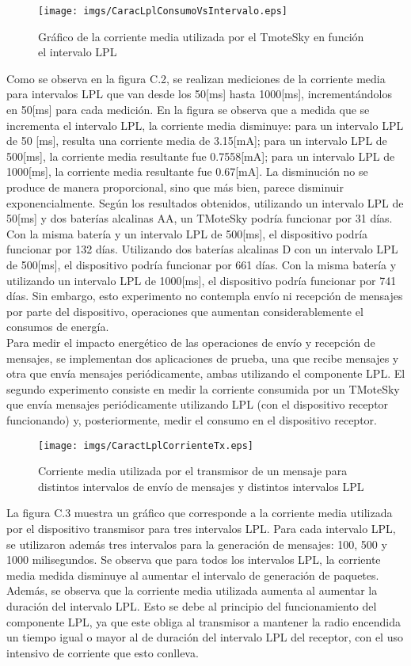 \begin{figure}[H]
 \centering
 \texttt{[image: imgs/CaracLplConsumoVsIntervalo.eps]}
 \caption{Gráfico de la corriente media utilizada por el TmoteSky en función el intervalo LPL}
\end{figure}

Como se observa en la figura C.2, se realizan mediciones de la corriente media para intervalos LPL que van desde los 50[ms] hasta 1000[ms], incrementándolos en 50[ms] para cada medición. En la figura se observa que a medida que se incrementa el intervalo LPL, la corriente media disminuye: para un intervalo LPL de 50 [ms], resulta una corriente media de 3.15[mA]; para un intervalo LPL de 500[ms], la corriente media resultante fue 0.7558[mA]; para un intervalo LPL de 1000[ms], la corriente media resultante fue 0.67[mA]. La disminución no se produce de manera proporcional, sino que más bien, parece disminuir exponencialmente. Según los resultados obtenidos, utilizando un intervalo LPL de 50[ms] y dos baterías alcalinas AA, un TMoteSky podría funcionar por 31 días. Con la misma batería y un intervalo LPL de 500[ms], el dispositivo podría funcionar por 132 días. Utilizando dos baterías alcalinas D con un intervalo LPL de 500[ms], el dispositivo podría funcionar por 661 días. Con la misma batería y utilizando un intervalo LPL de 1000[ms], el dispositivo podría funcionar por 741 días. Sin embargo, esto experimento no contempla envío ni recepción de mensajes por parte del dispositivo, operaciones que aumentan considerablemente el consumos de energía.\\

Para medir el impacto energético de las operaciones de envío y recepción de mensajes, se implementan dos aplicaciones de prueba, una que recibe mensajes y otra que envía mensajes periódicamente, ambas utilizando el componente LPL. El segundo experimento consiste en medir la corriente consumida por un TMoteSky que envía mensajes periódicamente utilizando LPL (con el dispositivo receptor funcionando) y, posteriormente, medir el consumo en el dispositivo receptor.

\begin{figure}[H]
 \centering
\texttt{[image: imgs/CaractLplCorrienteTx.eps]}
\caption{Corriente media utilizada por el transmisor de un mensaje para distintos intervalos de envío de mensajes y distintos intervalos LPL }
\end{figure}

La figura C.3 muestra un gráfico que corresponde a la corriente media utilizada por el dispositivo transmisor para tres intervalos LPL. Para cada intervalo LPL, se utilizaron además tres intervalos para la generación de mensajes: 100, 500 y 1000 milisegundos. Se observa que para todos los intervalos LPL, la corriente media medida disminuye al aumentar el intervalo de generación de paquetes. Además, se observa que la corriente media utilizada aumenta al aumentar la duración del intervalo LPL. Esto se debe al principio del funcionamiento del componente LPL, ya que este obliga al transmisor a mantener la radio encendida un tiempo igual o mayor al de duración del intervalo LPL del receptor, con el uso intensivo de corriente que esto conlleva.

